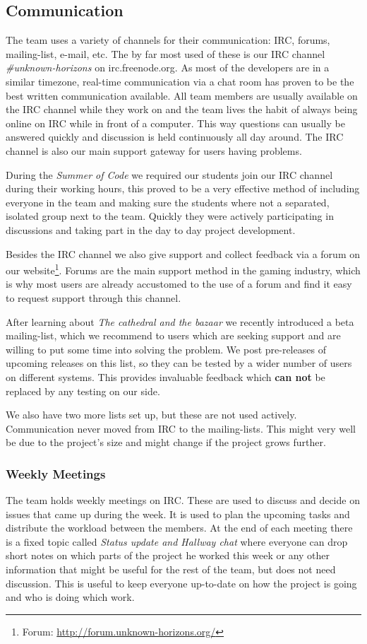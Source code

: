 \subsection{Communication}
The team uses a variety of channels for their communication: IRC, forums, mailing-list, e-mail, etc. 
The by far most used of
these is our IRC channel \textit{\#unknown-horizons} on irc.freenode.org. As most of the developers are in a similar
timezone, real-time communication via a chat room has proven to be the best written communication available. All team members are
usually available on the IRC channel while they work on \UH{} and the team lives the habit of always being online on
IRC while in front of a computer. This way questions can usually be answered quickly and discussion is held continuously
all day around. The IRC channel is also our main support gateway for users having problems.

During the \textit{Summer of Code} we required our students join our IRC channel during their working hours, this proved
to be a very effective method of including everyone in the team and making sure the students where not a separated,
isolated group next to the team. Quickly they were actively participating in discussions and taking part in the day to
day project development.

Besides the IRC channel we also give support and collect feedback via a forum on our website\footnote{\UH{} Forum:
\url{http://forum.unknown-horizons.org/}}. Forums are the main support method in the gaming industry, which is why most
users are already accustomed to the use of a forum and find it easy to request support through this channel.

After learning about \textit{The cathedral and the bazaar}\cite{springerlink:10.1007/s12130-999-1026-0} we recently
introduced a beta mailing-list, which we recommend to users which are seeking support and are willing to put some time into
solving the problem. We post pre-releases of upcoming releases on this list, so they can be tested by a wider number
of users on different systems. This provides invaluable feedback which \textbf{can not} be replaced by any testing on our side.

We also have two more lists set up, but these are not used actively. Communication never moved from IRC to the
mailing-lists. This might very well be due to the project's size and might change if the project grows further.

\subsubsection{Weekly Meetings}
The team holds weekly meetings on IRC. These are used to discuss and decide on issues that came up during the week. It is
used to plan the upcoming tasks and distribute the workload between the members. At the end of each meeting there is a
fixed topic called \textit{Status update and Hallway chat} where everyone can drop short notes on which parts of the
project he worked this week or any other information that might be useful for the rest of the team, but does not need
discussion. This is useful to keep everyone up-to-date on how the project is going and who is doing which work.


